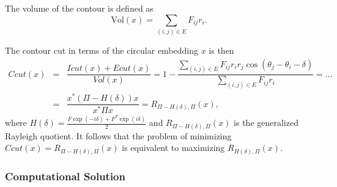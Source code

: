 \documentclass{SMBV12}
\begin{document}
The volume of the contour is defined as
\begin{equation}
\mbox{Vol}(x) = \sum\limits_{(i, j) \in E}F_{ij}r_i.
\end{equation}

The contour cut in terms of the circular embedding $x$ is then
\begin{equation}
\begin{array}{lcl}
Ccut(x) & = & \dfrac{Icut(x) + Ecut(x)}{Vol(x)} = 1 - \dfrac{\sum\limits_{(i, j) \in E}F_{ij}r_ir_j\cos(\theta_j - \theta_i - \delta)}{\sum\limits_{(i, j) \in E}F_{ij}r_i} = ... \\
& = & \dfrac{x^*(\Pi - H(\delta))x}{x^* \Pi x} = R_{\Pi - H(\delta), \Pi}(x),
\end{array}
\end{equation}
where $H(\delta) = \frac{F\exp(-i\delta) + F^T\exp(i\delta)}{2}$ and $R_{\Pi - H(\delta), \Pi}(x)$ is the generalized Rayleigh quotient. It follows that the problem of minimizing $Ccut(x) = R_{\Pi - H(\delta), \Pi}(x)$ is equivalent to maximizing $R_{H(\delta), \Pi}(x)$.

\subsubsection{Computational Solution}
\end{document}
